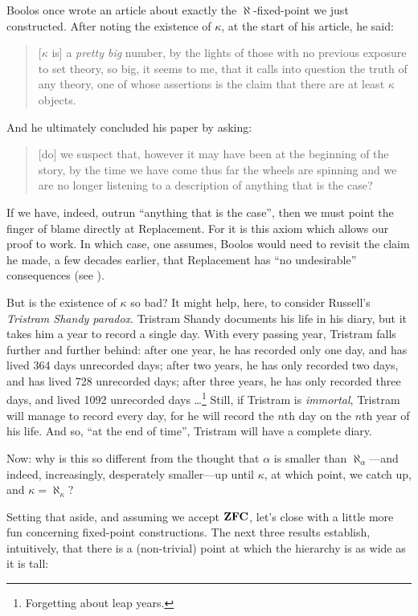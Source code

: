 \documentclass[../../../include/open-logic-section]{subfiles}
\begin{document}
Boolos once wrote an article about exactly the $\aleph$-fixed-point we
just constructed. After noting the existence of $\kappa$, at the start
of his article, he said:
\begin{quote}
	[$\kappa$ is] a \emph{pretty big} number, by the lights of those
	with no previous exposure to  set theory,  so big, it seems to me,
	that  it calls into question the truth of any theory, one of whose
	assertions is the claim that there are at least $\kappa$ objects.
	\citep[p.~257]{Boolos2000}
\end{quote}
And he ultimately concluded his paper by asking:
\begin{quote}
	[do] we  suspect that,  however  it  may  have  been  at  the
	beginning  of  the  story,  by  the  time  we have come thus  far
	the wheels  are  spinning  and  we  are no longer  listening  to
	a description  of  anything  that  is the case?
	\citep[p.~268]{Boolos2000}
\end{quote}
If we have, indeed, outrun ``anything that is the case'', then we must
point the finger of blame directly at Replacement. For it is this
axiom which allows our proof to work. In which case, one assumes,
Boolos would need to revisit the claim he made, a few decades earlier,
that Replacement has ``no undesirable'' consequences (see
).

But is the existence of $\kappa$ so bad? It might help, here, to
consider Russell's \emph{Tristram Shandy paradox}. Tristram Shandy
documents his life in his diary, but it takes him a year to record a
single day. With every passing year, Tristram falls further and
further behind: after one year, he has recorded only one day, and has
lived 364 days unrecorded days; after two years, he has only recorded
two days, and has lived 728 unrecorded days; after three years, he has
only recorded three days, and lived 1092 unrecorded
days \dots\footnote{Forgetting about leap years.} Still, if Tristram
is \emph{immortal}, Tristram will manage to record every day, for he
will record the $n$th day on the $n$th year of his life. And so, ``at
the end of time'', Tristram will have a complete diary. 

Now: why is this so different from the thought that $\alpha$ is
smaller than $\aleph_\alpha$---and indeed, increasingly, desperately
smaller---up until $\kappa$, at which point, we catch up, and $\kappa
= \aleph_\kappa$?

Setting that aside, and assuming we accept $\mathbf{ZFC}$, let's close with a
little more fun concerning fixed-point constructions. The next three
results establish, intuitively, that there is a (non-trivial) point at
which the hierarchy is as wide as it is tall:
\end{document}
